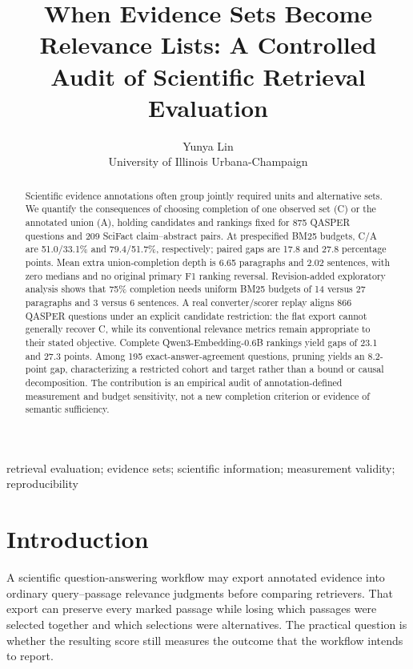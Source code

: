 \documentclass[twoside,a4paper,11pt]{article}
\begin{document}
\title{When Evidence Sets Become Relevance Lists: A Controlled Audit of Scientific Retrieval Evaluation}
\author{\name Yunya Lin \\ \addr University of Illinois Urbana-Champaign}
\maketitle
\begin{abstract}Scientific evidence annotations often group jointly required units and alternative sets. We quantify the consequences of choosing completion of one observed set (C) or the annotated union (A), holding candidates and rankings fixed for 875 QASPER questions and 209 SciFact claim--abstract pairs. At prespecified BM25 budgets, C/A are 51.0/33.1\% and 79.4/51.7\%, respectively; paired gaps are 17.8 and 27.8 percentage points. Mean extra union-completion depth is 6.65 paragraphs and 2.02 sentences, with zero medians and no original primary F1 ranking reversal. Revision-added exploratory analysis shows that 75\% completion needs uniform BM25 budgets of 14 versus 27 paragraphs and 3 versus 6 sentences. A real converter/scorer replay aligns 866 QASPER questions under an explicit candidate restriction: the flat export cannot generally recover C, while its conventional relevance metrics remain appropriate to their stated objective. Complete Qwen3-Embedding-0.6B rankings yield gaps of 23.1 and 27.3 points. Among 195 exact-answer-agreement questions, pruning yields an 8.2-point gap, characterizing a restricted cohort and target rather than a bound or causal decomposition. The contribution is an empirical audit of annotation-defined measurement and budget sensitivity, not a new completion criterion or evidence of semantic sufficiency.\end{abstract}
\begin{keywords}retrieval evaluation; evidence sets; scientific information; measurement validity; reproducibility\end{keywords}

\section{Introduction}
A scientific question-answering workflow may export annotated evidence into ordinary query--passage relevance judgments before comparing retrievers. That export can preserve every marked passage while losing which passages were selected together and which selections were alternatives. The practical question is whether the resulting score still measures the outcome that the workflow intends to report.
\end{document}
